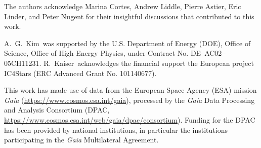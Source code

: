 \documentclass[linenumbers,trackchanges,margins]{aastex701}
\begin{document}
\begin{acknowledgments}
The authors acknowledge Marina Cortes, Andrew Liddle, Pierre Astier, Eric Linder, and Peter Nugent for their insightful discussions that contributed to this work.

A.~G.~Kim\ was supported by the U.S. Department of Energy (DOE), Office
of Science, Office of High Energy Physics, under Contract No. DE–AC02–05CH11231.
R.~Kaiser\ acknowledges the financial support the European project IC4Stars (ERC Advanced Grant No. 101140677).

This work has made use of data from the European Space Agency (ESA) mission
{\it Gaia} (\url{https://www.cosmos.esa.int/gaia}), processed by the {\it Gaia}
Data Processing and Analysis Consortium (DPAC,
\url{https://www.cosmos.esa.int/web/gaia/dpac/consortium}). Funding for the DPAC
has been provided by national institutions, in particular the institutions
participating in the {\it Gaia} Multilateral Agreement.
\end{acknowledgments}




\end{document}

